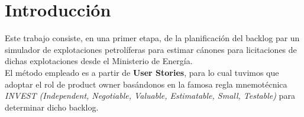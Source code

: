 \section*{Introducción}

Este trabajo consiste, en una primer etapa, de la planificación del backlog par un simulador de explotaciones petrolíferas para estimar cánones para licitaciones de dichas explotaciones desde el Ministerio de Energía. 
\\

El método empleado es a partir de \textbf{User Stories}, para lo cual tuvimos que adoptar el rol de product owner basándonos en la famosa regla mnemotécnica \emph{INVEST (Independent, Negotiable, Valuable, Estimatable, Small, Testable)} para determinar dicho backlog. 
